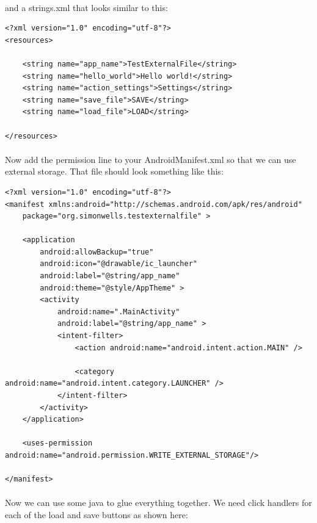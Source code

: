 \paragraph{} and a strings.xml that looks similar to this:

\begin{lstlisting}
<?xml version="1.0" encoding="utf-8"?>
<resources>

    <string name="app_name">TestExternalFile</string>
    <string name="hello_world">Hello world!</string>
    <string name="action_settings">Settings</string>
    <string name="save_file">SAVE</string>
    <string name="load_file">LOAD</string>

</resources>
\end{lstlisting}

\paragraph{} Now add the permission line to your AndroidManifest.xml so that we can use external storage. That file should look something like this:

\begin{lstlisting}
<?xml version="1.0" encoding="utf-8"?>
<manifest xmlns:android="http://schemas.android.com/apk/res/android"
    package="org.simonwells.testexternalfile" >

    <application
        android:allowBackup="true"
        android:icon="@drawable/ic_launcher"
        android:label="@string/app_name"
        android:theme="@style/AppTheme" >
        <activity
            android:name=".MainActivity"
            android:label="@string/app_name" >
            <intent-filter>
                <action android:name="android.intent.action.MAIN" />

                <category android:name="android.intent.category.LAUNCHER" />
            </intent-filter>
        </activity>
    </application>

    <uses-permission android:name="android.permission.WRITE_EXTERNAL_STORAGE"/>

</manifest>

\end{lstlisting}

\paragraph{} Now we can use some java to glue everything together. We need click handlers for each of the load and save buttons as shown here:

